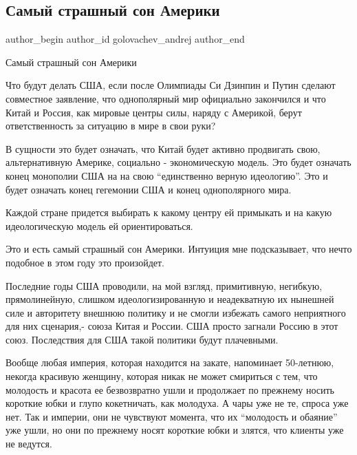  
 
 
 
 
 
\subsection{Самый страшный сон Америки}
\label{sec:26_01_2022.fb.golovachev_andrej.1.strashnyj_son_ameriki}
 
\ifcmt
 author_begin
   author_id golovachev_andrej
 author_end
\fi


Самый страшный сон Америки

Что будут делать США, если после Олимпиады Си Дзинпин и Путин сделают
совместное заявление, что однополярный мир официально закончился и что Китай и
Россия, как мировые центры силы, наряду  с Америкой,  берут ответственность за
ситуацию в мире в свои руки?

В сущности это будет означать, что Китай будет активно продвигать свою,
альтернативную Америке, социально - экономическую модель. Это будет означать
конец монополии США на на свою \enquote{единственно верную идеологию}. Это и
будет означать конец гегемонии США и конец однополярного мира. 

Каждой стране придется выбирать к какому центру  ей примыкать и на какую
идеологическую модель ей ориентироваться.

Это и есть самый страшный сон Америки. Интуиция мне подсказывает, что нечто
подобное  в этом году это произойдет.

Последние годы США проводили, на мой взгляд, примитивную, негибкую,
прямолинейную, слишком идеологизированную и неадекватную  их нынешней силе   и
авторитету   внешнюю политику и не смогли избежать самого неприятного для них
сценария,- союза Китая и России. США просто загнали Россию в этот союз.
Последствия для США такой политики будут плачевными.

Вообще любая империя, которая находится на закате,  напоминает 50-летнюю,
некогда красивую женщину, которая никак не может смириться с тем, что молодость
и  красота ее безвозвратно ушли и продолжает по прежнему  носить короткие юбки
и глупо кокетничать, как молодуха. А  чары уже не те,  спроса уже нет. Так и
империи, они не чувствуют момента, что их \enquote{молодость и обаяние} уже
ушли, но они по прежнему носят короткие юбки и злятся, что клиенты уже не
ведутся.
